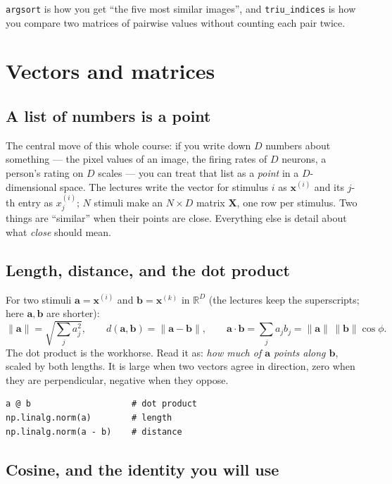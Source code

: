 \documentclass[11pt]{article}
\begin{document}
\texttt{argsort} is how you get ``the five most similar images'', and
\texttt{triu\_indices} is how you compare two matrices of pairwise values
without counting each pair twice.

\section{Vectors and matrices}

\subsection{A list of numbers is a point}

The central move of this whole course: if you write down $D$ numbers about
something --- the pixel values of an image, the firing rates of $D$ neurons, a
person's rating on $D$ scales --- you can treat that list as a \emph{point} in a
$D$-dimensional space. The lectures write the vector for stimulus $i$ as
$\bm{x}^{(i)}$ and its $j$-th entry as $x^{(i)}_j$; $N$ stimuli make an
$N \times D$ matrix $\bm{X}$, one row per stimulus. Two things are ``similar'' when their points are close.
Everything else is detail about what \emph{close} should mean.

\subsection{Length, distance, and the dot product}

For two stimuli $\bm{a} = \bm{x}^{(i)}$ and $\bm{b} = \bm{x}^{(k)}$ in $\mathbb{R}^D$ (the lectures keep the superscripts; here $\bm{a}, \bm{b}$ are shorter):
\[
\|\bm{a}\| = \sqrt{\textstyle\sum_j a_j^2}, \qquad
d(\bm{a},\bm{b}) = \|\bm{a}-\bm{b}\|, \qquad
\bm{a}\cdot\bm{b} = \textstyle\sum_j a_j b_j = \|\bm{a}\|\,\|\bm{b}\|\cos\phi .
\]
The dot product is the workhorse. Read it as: \emph{how much of $\bm{a}$ points
along $\bm{b}$}, scaled by both lengths. It is large when two vectors agree in
direction, zero when they are perpendicular, negative when they oppose.

\begin{lstlisting}
a @ b                    # dot product
np.linalg.norm(a)        # length
np.linalg.norm(a - b)    # distance
\end{lstlisting}

\subsection{Cosine, and the identity you will use}
\end{document}
